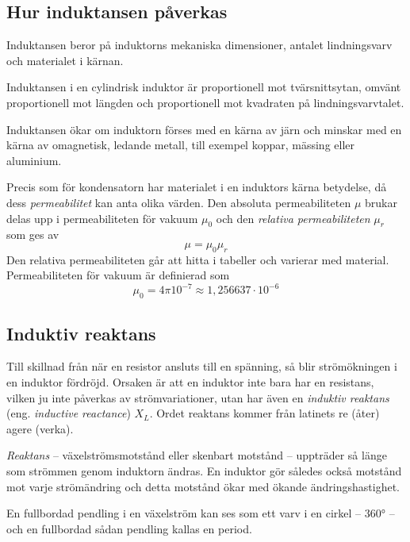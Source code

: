 \subsection{Hur induktansen påverkas}

Induktansen beror på induktorns mekaniska dimensioner, antalet lindningsvarv och
materialet i kärnan.

Induktansen i en cylindrisk induktor är proportionell mot tvärsnittsytan, omvänt
proportionell mot längden och proportionell mot kvadraten på lindningsvarvtalet.

Induktansen ökar om induktorn förses med en kärna av järn och minskar med en
kärna av omagnetisk, ledande metall, till exempel koppar, mässing eller
aluminium.

Precis som för kondensatorn har materialet i en induktors kärna betydelse,
då dess \emph{permeabilitet} kan anta olika värden. Den absoluta permeabiliteten
\(\mu\) brukar delas upp i permeabiliteten för vakuum \(\mu_0\) och den
\emph{relativa permeabiliteten} \(\mu_r\) som ges av
\[\mu = \mu_0\mu_r\]
Den relativa permeabiliteten går att hitta i tabeller och varierar med material.
Permeabiliteten för vakuum är definierad som
\[\mu_0 = 4\pi 10^{-7} \approx 1,256637 \cdot 10^{-6}\]

\subsection{Induktiv reaktans}
\label{induktiv_reaktans} 

Till skillnad från när en resistor ansluts till en spänning, så blir
strömökningen i en induktor fördröjd. Orsaken är att en induktor inte bara har
en resistans, vilken ju inte påverkas av strömvariationer, utan har även en
\emph{induktiv reaktans} (eng. \emph{inductive reactance}) \(X_L\).
Ordet reaktans kommer från latinets re (åter) agere (verka).

\emph{Reaktans} -- växelströmsmotstånd eller skenbart motstånd -- uppträder så
länge som strömmen genom induktorn ändras.
En induktor gör således också motstånd mot varje strömändring och detta motstånd
ökar med ökande ändringshastighet.

En fullbordad pendling i en växelström kan ses som ett varv i en cirkel --
\ang{360} -- och en fullbordad sådan pendling kallas en period.

